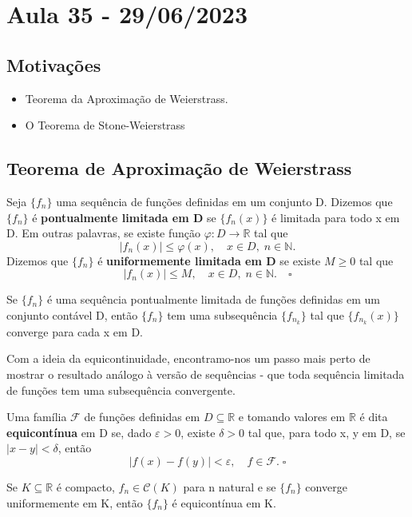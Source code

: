 \documentclass[../analysis_notes.tex]{subfiles}
\begin{document}
\section{Aula 35 - 29/06/2023}
\subsection{Motivações}
\begin{itemize}
	\item Teorema da Aproximação de Weierstrass.
	\item O Teorema de Stone-Weierstrass
\end{itemize}
\subsection{Teorema de Aproximação de Weierstrass}
\begin{def*}
	Seja \(\{f_{n}\}\) uma sequência de funções definidas em um conjunto D. Dizemos que \(\{f_{n}\}\) é \textbf{pontualmente limitada em D} se \(\{f_{n}(x)\}\) é limitada para todo x em D. Em outras palavras, se existe função \(\varphi : D \rightarrow \mathbb{R}\) tal que
	\[
		|f_{n}(x)| \leq \varphi (x),\quad x\in D,\; n\in \mathbb{N}.
	\]
	Dizemos que \(\{f_{n}\}\) é \textbf{uniformemente limitada em D} se existe \(M\geq 0\) tal que
	\[
		|f_{n}(x)| \leq M,\quad x\in D,\; n\in \mathbb{N}.\quad \square
	\]
\end{def*}
\begin{theorem*}
	Se \(\{f_{n}\}\) é uma sequência pontualmente limitada de funções definidas em um conjunto contável D, então \(\{f_{n}\}\) tem uma subsequência \(\{f_{n_{k}}\}\) tal que \(\{f_{n_{k}}(x)\}\) converge para cada x em D.
\end{theorem*}
Com a ideia da equicontinuidade, encontramo-nos um passo mais perto de mostrar o resultado análogo à versão de sequências - que toda sequência limitada de funções tem uma subsequência convergente.
\begin{def*}
	Uma família \(\mathcal{F}\) de funções definidas em \(D\subseteq \mathbb{R}\) e tomando valores em \(\mathbb{R}\) é dita \textbf{equicontínua} em D se, dado \(\varepsilon > 0\), existe \(\delta > 0\) tal que, para todo x, y em D, se \(|x-y|<\delta \), então
	\[
		|f(x)-f(y)|<\varepsilon , \quad f \in \mathcal{F}. \; \square
	\]
\end{def*}
\begin{theorem*}
	Se \(K\subseteq \mathbb{R}\) é compacto, \(f_{n}\in \mathcal{C}(K)\) para n natural e se \(\{f_{n}\}\) converge uniformemente em K, então \(\{f_{n}\}\) é equicontínua em K.
\end{theorem*}
\end{document}
